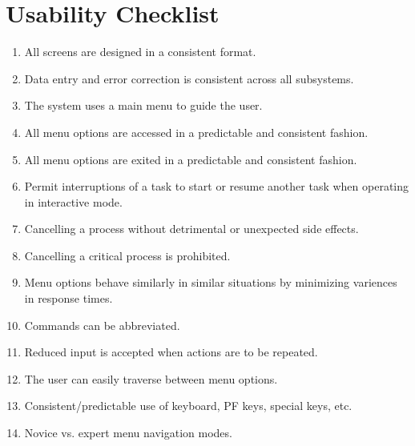  \section {Usability Checklist}
 \begin{enumerate}
  \item All screens are designed in a consistent format.
  \item Data entry and error correction is consistent across all
    subsystems.
  \item The system uses a main menu to guide the user.
  \item All menu options are accessed in a predictable and
    consistent fashion.
  \item All menu options are exited in a predictable and
    consistent fashion.
  \item Permit interruptions of a task to start or resume another task
    when operating in interactive mode.
  \item Cancelling a process without detrimental or unexpected side
    effects.
  \item Cancelling a critical process is prohibited.
  \item Menu options behave similarly in similar situations by minimizing
    variences in response times.
  \item Commands can be abbreviated.
  \item Reduced input is accepted when actions are to be repeated.
  \item The user can easily traverse between menu options.
  \item Consistent/predictable use of keyboard, PF keys, special keys,
    etc.
  \item Novice vs. expert menu navigation modes.
 \end{enumerate}

